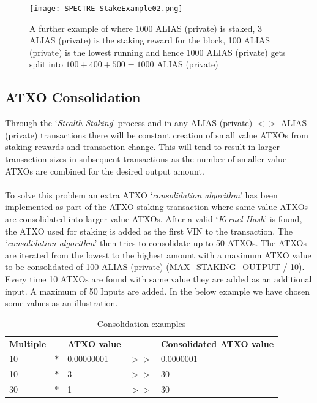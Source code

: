 \begin{figure}[ht]
	\centering
	\texttt{[image: SPECTRE-StakeExample02.png]}
	\caption{A further example of where 1000 ALIAS (private) is staked, 3 ALIAS (private) 
	is the staking reward for the block, 100 ALIAS (private) is the lowest running 
	and hence 1000 ALIAS (private) gets split into $100 + 400 + 500 = 1000$ ALIAS (private)}
\end{figure}



\subsection{ATXO Consolidation}
Through the ‘\textit{Stealth Staking}’ process and in any ALIAS (private) $<>$
ALIAS (private) transactions there will be constant creation of small value ATXOs
from staking rewards and transaction change. This will tend to result in
larger transaction sizes in subsequent transactions as the number of
smaller value ATXOs are combined for the desired output amount.
\\
\\
\noindent
To solve this problem an extra ATXO ‘\textit{consolidation algorithm}’
has been implemented as part of the ATXO staking transaction where same
value ATXOs are consolidated into larger value ATXOs. After a valid
‘\textit{Kernel Hash}’ is found, the ATXO used for staking is added
as the first VIN to the transaction. The ‘\textit{consolidation algorithm}’
then tries to consolidate up to 50 ATXOs. The ATXOs are iterated from the
lowest to the highest amount with a maximum ATXO value to be consolidated
of 100 ALIAS (private) (MAX\_STAKING\_OUTPUT / 10). Every time 10 ATXOs are found
with same value they are added as an additional input. A maximum of 50
Inputs are added. In the below example we have chosen some values as an
illustration.



   \begin{table}[h]
	\centering
	\begin{tabular}{lllll}
		\textbf{Multiple} &     & \textbf{ATXO value} &      & \textbf{Consolidated ATXO value} \\
		10                & $*$ & 0.00000001          & $>>$ & 0.0000001 \\
		10                & $*$ & 3                   & $>>$ & 30        \\
		30                & $*$ & 1                   & $>>$ & 30        \\
	\end{tabular}

	\caption{Consolidation examples}
	\label{tbl:consolidationExamples}
\end{table}

